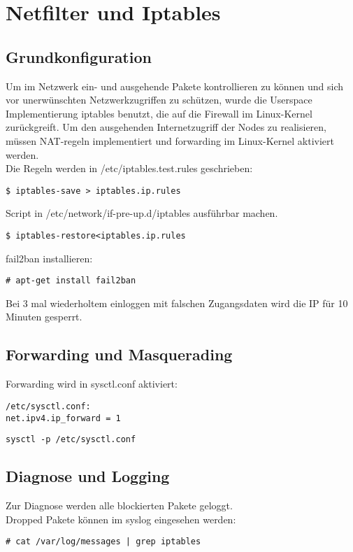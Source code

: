 \chapter{Netfilter und Iptables}
\section{Grundkonfiguration}
Um im Netzwerk ein- und ausgehende Pakete kontrollieren zu können 
und sich vor unerwünschten Netzwerkzugriffen zu schützen, wurde die 
Userspace Implementierung iptables benutzt, die auf die Firewall im Linux-Kernel zurückgreift.
Um den ausgehenden Internetzugriff der Nodes zu realisieren,
müssen NAT-regeln implementiert und forwarding im Linux-Kernel aktiviert werden.\\
Die Regeln werden in /etc/iptables.test.rules geschrieben:

\begin{lstlisting}[style=Bash]
$ iptables-save > iptables.ip.rules
\end{lstlisting}
Script in /etc/network/if-pre-up.d/iptables ausführbar machen.\\
\begin{lstlisting}[style=Bash]
$ iptables-restore<iptables.ip.rules
\end{lstlisting}
fail2ban installieren:
\begin{lstlisting}[style=Bash]
# apt-get install fail2ban
\end{lstlisting}
Bei 3 mal wiederholtem einloggen mit falschen Zugangsdaten wird die IP für 10 Minuten gesperrt.
\section{Forwarding und Masquerading}
Forwarding wird in sysctl.conf aktiviert:
\begin{lstlisting}[style=Bash]
/etc/sysctl.conf:
net.ipv4.ip_forward = 1
\end{lstlisting}
\begin{lstlisting}[style=Bash]
sysctl -p /etc/sysctl.conf
\end{lstlisting}
\section{Diagnose und Logging}
Zur Diagnose werden alle blockierten Pakete geloggt.\\
Dropped Pakete können im syslog eingesehen werden:
\begin{lstlisting}[style=Bash]
# cat /var/log/messages | grep iptables
\end{lstlisting}
